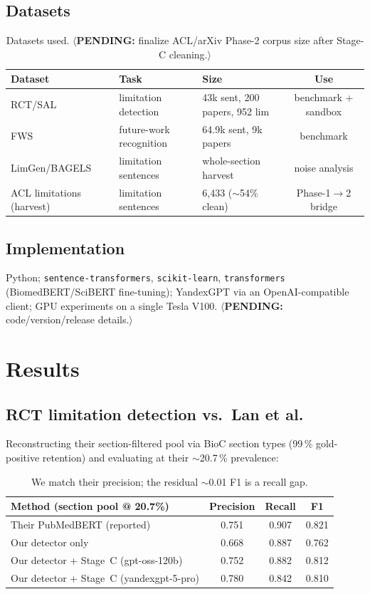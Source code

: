 \documentclass[10pt,a4paper]{article}
\newcommand{\pending}[1]{\textcolor{red!80!black}{$\langle$\textbf{PENDING:} #1$\rangle$}}
\newcommand{\done}[1]{\textcolor{green!45!black}{#1}}
\begin{document}
\subsection{Datasets}
\begin{table}[h]\centering\small
\begin{tabular}{@{}lllc@{}}
\toprule
Dataset & Task & Size & Use \\ \midrule
RCT/SAL~\citep{rctlimits} & limitation detection & 43k sent, 200 papers, 952 lim & benchmark + sandbox \\
FWS~\citep{zhangfws2022} & future-work recognition & 64.9k sent, 9k papers & benchmark \\
LimGen/BAGELS~\citep{limgen2024,bagels} & limitation sentences & whole-section harvest & noise analysis \\
ACL limitations (harvest) & limitation sentences & 6{,}433 ($\sim$54\% clean) & Phase-1$\to$2 bridge \\
\bottomrule
\end{tabular}
\caption{Datasets used. \pending{finalize ACL/arXiv Phase-2 corpus size after Stage-C cleaning.}}
\end{table}

\subsection{Implementation}
Python; \texttt{sentence-transformers}, \texttt{scikit-learn}, \texttt{transformers}
(BiomedBERT/SciBERT fine-tuning); YandexGPT via an OpenAI-compatible client; GPU experiments on a
single Tesla V100. \pending{code/version/release details.}

\section{Results}
\subsection{RCT limitation detection vs.\ Lan et al.}
Reconstructing their section-filtered pool via BioC section types (99\,\% gold-positive
retention) and evaluating at their $\sim$20.7\,\% prevalence:
\begin{table}[h]\centering\small
\begin{tabular}{@{}lccc@{}}
\toprule
Method (section pool @ 20.7\%) & Precision & Recall & F1 \\ \midrule
Their PubMedBERT (reported) & 0.751 & 0.907 & 0.821 \\
Our detector only & 0.668 & 0.887 & 0.762 \\
Our detector + Stage~C (gpt-oss-120b) & 0.752 & 0.882 & 0.812 \\
Our detector + Stage~C (yandexgpt-5-pro) & 0.780 & 0.842 & 0.810 \\
\bottomrule
\end{tabular}
\caption{\done{We match their precision; the residual $\sim$0.01 F1 is a recall gap.}}
\end{table}
\end{document}
